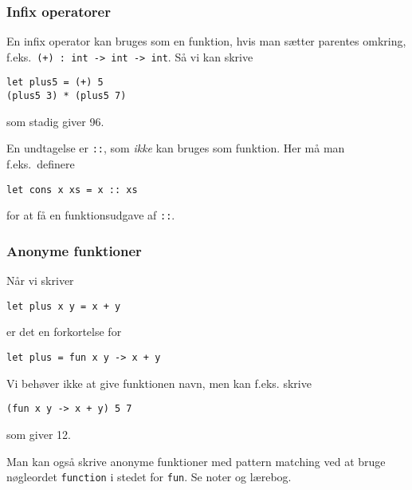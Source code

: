 \documentclass{beamer}
\begin{document}
\begin{frame}[fragile=singleslide]
\frametitle{Infix operatorer}

En infix operator kan bruges som en funktion, hvis man sætter parentes
omkring, f.eks.\ \texttt{(+) : int -> int -> int}.  Så vi kan skrive


\begin{verbatim}
let plus5 = (+) 5
(plus5 3) * (plus5 7)
\end{verbatim}

som stadig giver 96.

\vspace{1ex}

En undtagelse er \texttt{::}, som \emph{ikke} kan bruges som
funktion.  Her må man f.eks.\ definere


\begin{verbatim}
let cons x xs = x :: xs
\end{verbatim}

for at få en funktionsudgave af \texttt{::}.

\end{frame}

\begin{frame}[fragile=singleslide]
\frametitle{Anonyme funktioner}

Når vi skriver

\begin{verbatim}
let plus x y = x + y
\end{verbatim}

er det en forkortelse for

\begin{verbatim}
let plus = fun x y -> x + y
\end{verbatim}

Vi behøver ikke at give funktionen navn, men kan f.eks. skrive

\begin{verbatim}
(fun x y -> x + y) 5 7
\end{verbatim}

som giver 12.

\vspace{1ex}

Man kan også skrive anonyme funktioner med pattern matching ved at
bruge nøgleordet \texttt{function} i stedet for \texttt{fun}.  Se
noter og lærebog.

\end{frame}
\end{document}
